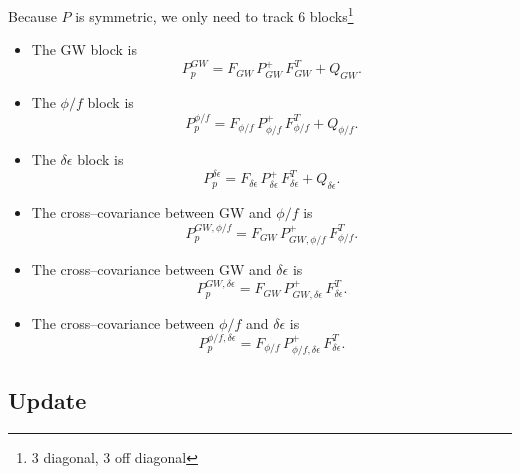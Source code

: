 \documentclass{tufte-handout} %
\begin{document}
Because $P$ is symmetric, we only need to track 6 blocks\footnote{3 diagonal, 3 off diagonal}
\begin{itemize}
	\item The GW block is 
	\begin{equation}
		P_{p}^{GW} = F_{GW}\,P^+_{GW}\,F_{GW}^T + Q_{GW}.
	\end{equation}
	\item The \(\phi/f\) block is 
	\begin{equation}
		P_{p}^{\phi/f} = F_{\phi/f}\,P^+_{\phi/f}\,F_{\phi/f}^T + Q_{\phi/f}.
	\end{equation}
	\item The \(\delta\epsilon\) block is 
	\begin{equation}
		P_{p}^{\delta\epsilon} = F_{\delta\epsilon}\,P^+_{\delta\epsilon}\,F_{\delta\epsilon}^T + Q_{\delta\epsilon}.
	\end{equation}
	\item The cross–covariance between GW and \(\phi/f\) is 
	\begin{equation}
		P_{p}^{GW,\phi/f} = F_{GW}\,P^+_{GW,\phi/f}\,F_{\phi/f}^T.
	\end{equation}
	\item The cross–covariance between GW and \(\delta\epsilon\) is 
	\begin{equation}
		P_{p}^{GW,\delta\epsilon} = F_{GW}\,P^+_{GW,\delta\epsilon}\,F_{\delta\epsilon}^T.
	\end{equation}
	\item The cross–covariance between \(\phi/f\) and \(\delta\epsilon\) is 
	\begin{equation}
		P_{p}^{\phi/f,\delta\epsilon} = F_{\phi/f}\,P^+_{\phi/f,\delta\epsilon}\,F_{\delta\epsilon}^T.
	\end{equation}
\end{itemize}



\subsection{Update}
\end{document}
